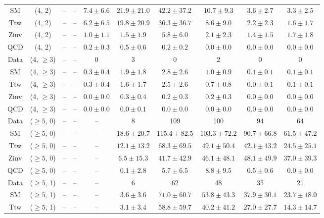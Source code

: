 \begin{table}[h!]
{\begin{tabular}{cccccccccc}
	SM & (4, 2) & -- & -- & $7.4\pm 6.6$ & $21.9\pm 21.0$ & $42.2\pm 37.2$ & $10.7\pm 9.3$ & $3.6\pm 2.7$ & $3.3\pm 2.5$ \\[0.5ex] 
	Ttw & (4, 2) & -- & -- & $6.2\pm 6.5$ & $19.8\pm 20.9$ & $36.3\pm 36.7$ & $8.6\pm 9.0$ & $2.2\pm 2.3$ & $1.6\pm 1.7$ \\[0.5ex] 
	Zinv & (4, 2) & -- & -- & $1.0\pm 1.1$ & $1.5\pm 1.9$ & $5.8\pm 6.0$ & $2.1\pm 2.3$ & $1.4\pm 1.5$ & $1.7\pm 1.8$ \\[0.5ex] 
	QCD & (4, 2) & -- & -- & $0.2\pm 0.3$ & $0.5\pm 0.6$ & $0.2\pm 0.2$ & $0.0\pm 0.0$ & $0.0\pm 0.0$ & $0.0\pm 0.0$ \\[0.5ex] 
	Data & (4, $\ge3$) & -- & -- & 0 & 3 & 0 & 2 & 0 & 0 \\[0.5ex] 
	SM & (4, $\ge3$) & -- & -- & $0.3\pm 0.4$ & $1.9\pm 1.8$ & $2.8\pm 2.6$ & $1.0\pm 0.9$ & $0.1\pm 0.1$ & $0.1\pm 0.1$ \\[0.5ex] 
	Ttw & (4, $\ge3$) & -- & -- & $0.3\pm 0.4$ & $1.6\pm 1.7$ & $2.5\pm 2.6$ & $0.7\pm 0.8$ & $0.0\pm 0.1$ & $0.1\pm 0.1$ \\[0.5ex] 
	Zinv & (4, $\ge3$) & -- & -- & $0.0\pm 0.0$ & $0.3\pm 0.4$ & $0.2\pm 0.3$ & $0.2\pm 0.3$ & $0.0\pm 0.0$ & $0.0\pm 0.0$ \\[0.5ex] 
	QCD & (4, $\ge3$) & -- & -- & $0.0\pm 0.0$ & $0.0\pm 0.1$ & $0.0\pm 0.0$ & $0.0\pm 0.0$ & $0.0\pm 0.0$ & $0.0\pm 0.0$ \\[0.5ex] 
	Data & ($\ge5$, 0) & -- & -- & -- & 8 & 109 & 100 & 94 & 64 \\[0.5ex] 
	SM & ($\ge5$, 0) & -- & -- & -- & $18.6\pm 20.7$ & $115.4\pm 82.5$ & $103.3\pm 72.2$ & $90.7\pm 66.8$ & $61.5\pm 47.2$ \\[0.5ex] 
	Ttw & ($\ge5$, 0) & -- & -- & -- & $12.1\pm 13.2$ & $68.3\pm 69.5$ & $49.1\pm 50.4$ & $42.1\pm 43.2$ & $24.5\pm 25.1$ \\[0.5ex] 
	Zinv & ($\ge5$, 0) & -- & -- & -- & $6.5\pm 15.3$ & $41.7\pm 42.9$ & $46.1\pm 48.1$ & $48.1\pm 49.9$ & $37.0\pm 39.3$ \\[0.5ex] 
	QCD & ($\ge5$, 0) & -- & -- & -- & $0.1\pm 2.8$ & $5.7\pm 6.5$ & $8.8\pm 9.5$ & $0.5\pm 0.6$ & $0.0\pm 0.0$ \\[0.5ex] 
	Data & ($\ge5$, 1) & -- & -- & -- & 6 & 62 & 48 & 35 & 21 \\[0.5ex] 
	SM & ($\ge5$, 1) & -- & -- & -- & $3.6\pm 3.6$ & $71.0\pm 60.7$ & $53.8\pm 43.3$ & $37.9\pm 30.1$ & $23.7\pm 18.0$ \\[0.5ex] 
	Ttw & ($\ge5$, 1) & -- & -- & -- & $3.1\pm 3.4$ & $58.8\pm 59.7$ & $40.2\pm 41.2$ & $27.0\pm 27.7$ & $14.3\pm 14.7$ \\[0.5ex] 

\end{tabular}}
\end{table}
